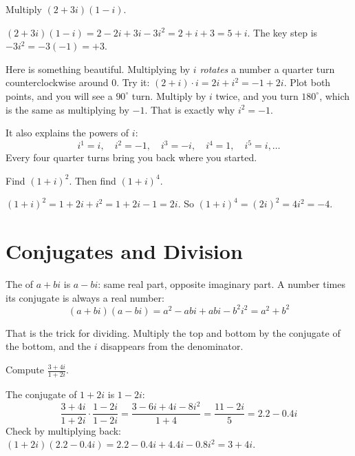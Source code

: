 \begin{Worked}
\begin{Problem}
Multiply $(2 + 3i)(1 - i)$.
\end{Problem}
\begin{Solution}
$(2 + 3i)(1 - i) = 2 - 2i + 3i - 3i^2 = 2 + i + 3 = 5 + i$.
The key step is $-3i^2 = -3(-1) = +3$.
\end{Solution}
\end{Worked}

Here is something beautiful. Multiplying by $i$ \emph{rotates} a number a
quarter turn counterclockwise around 0. Try it: $(2 + i) \cdot i = 2i + i^2
= -1 + 2i$. Plot both points, and you will see a $90^\circ$ turn. Multiply
by $i$ twice, and you turn $180^\circ$, which is the same as multiplying by
$-1$. That is exactly why $i^2 = -1$.

It also explains the powers of $i$:
$$i^1 = i, \quad i^2 = -1, \quad i^3 = -i, \quad i^4 = 1, \quad i^5 = i, \ldots$$
Every four quarter turns bring you back where you started.

\begin{Exercise}[title={Square a Complex Number}, label=cx1]
Find $(1 + i)^2$. Then find $(1 + i)^4$.
\end{Exercise}
\begin{Answer}[ref=cx1]
$(1 + i)^2 = 1 + 2i + i^2 = 1 + 2i - 1 = 2i$. So
$(1 + i)^4 = (2i)^2 = 4i^2 = -4$.
\end{Answer}

\section{Conjugates and Division}

The  of $a + bi$ is
$a - bi$: same real part, opposite imaginary part. A number times its
conjugate is always a real number:
$$(a + bi)(a - bi) = a^2 - abi + abi - b^2i^2 = a^2 + b^2$$

That is the trick for dividing. Multiply the top and bottom by the
conjugate of the bottom, and the $i$ disappears from the denominator.

\begin{Worked}
\begin{Problem}
Compute $\frac{3 + 4i}{1 + 2i}$.
\end{Problem}
\begin{Solution}
The conjugate of $1 + 2i$ is $1 - 2i$:
$$\frac{3 + 4i}{1 + 2i} \cdot \frac{1 - 2i}{1 - 2i} = \frac{3 - 6i + 4i - 8i^2}{1 + 4} = \frac{11 - 2i}{5} = 2.2 - 0.4i$$
Check by multiplying back: $(1 + 2i)(2.2 - 0.4i) = 2.2 - 0.4i + 4.4i - 0.8i^2 = 3 + 4i$.
\end{Solution}
\end{Worked}

